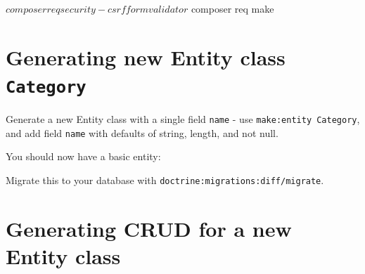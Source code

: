 \documentclass[a4paperpaper,openright]{book}
\newenvironment{Shaded}{}{}
\newcommand{\AnnotationTok}[1]{\textcolor[rgb]{0.38,0.63,0.69}{\textbf{\textit{#1}}}}
\newcommand{\CommentTok}[1]{\textcolor[rgb]{0.38,0.63,0.69}{\textit{#1}}}
\newcommand{\ExtensionTok}[1]{#1}
\newcommand{\KeywordTok}[1]{\textcolor[rgb]{0.00,0.44,0.13}{\textbf{#1}}}
\newcommand{\NormalTok}[1]{#1}
\newcommand{\OtherTok}[1]{\textcolor[rgb]{0.00,0.44,0.13}{#1}}
\newcommand{\StringTok}[1]{\textcolor[rgb]{0.25,0.44,0.63}{#1}}
\begin{document}
\begin{Shaded}
\begin{Highlighting}[]
\NormalTok{    $ }\ExtensionTok{composer}\NormalTok{ req security-csrf form validator}
\NormalTok{    $ }\ExtensionTok{composer}\NormalTok{ req make }
\end{Highlighting}
\end{Shaded}

\hypertarget{generating-new-entity-class-category}{%
\section{\texorpdfstring{Generating new Entity class
\texttt{Category}}{Generating new Entity class Category}}\label{generating-new-entity-class-category}}

Generate a new Entity class with a single field \texttt{name} - use
\texttt{make:entity\ Category}, and add field \texttt{name} with
defaults of string, length, and not null.

You should now have a basic entity:

\begin{Shaded}
\end{Shaded}

Migrate this to your database with
\texttt{doctrine:migrations:diff/migrate}.

\hypertarget{generating-crud-for-a-new-entity-class}{%
\section{Generating CRUD for a new Entity
class}\label{generating-crud-for-a-new-entity-class}}
\end{document}
